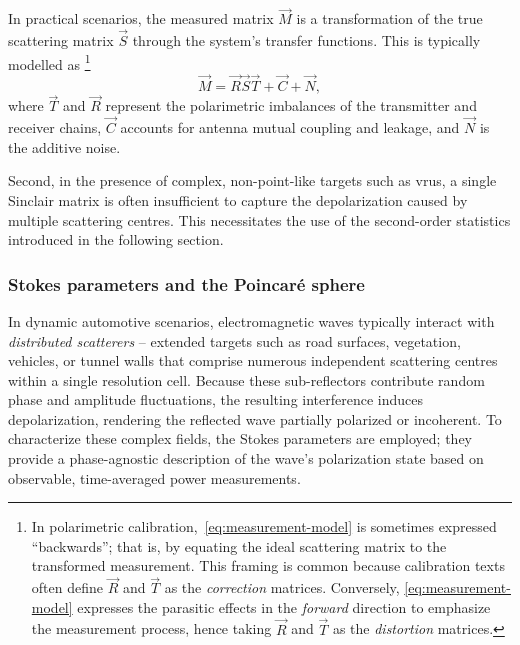 In practical scenarios, the measured matrix $\vec M$ is a transformation of the true scattering matrix $\vec S$ through the system's transfer functions.
This is typically modelled as%
    \footnote{
        In polarimetric calibration,~\cref{eq:measurement-model} is sometimes expressed \enquote{backwards}; that is, by equating the ideal scattering matrix to the transformed measurement.
        This framing is common because calibration texts often define $\vec R$ and $\vec T$ as the \emph{correction} matrices.
        Conversely, \cref{eq:measurement-model} expresses the parasitic effects in the \emph{forward} direction to emphasize the measurement process, hence taking $\vec R$ and $\vec T$ as the \emph{distortion} matrices.
    }
\begin{equation}
    \label{eq:measurement-model}
    \vec M = \vec R \vec S \vec T + \vec C + \vec N,
\end{equation}
where $\vec T$ and $\vec R$ represent the polarimetric imbalances of the transmitter and receiver chains, $\vec C$ accounts for antenna mutual coupling and leakage, and $\vec N$ is the additive noise.

Second, in the presence of complex, non-point-like targets such as \glspl{vru}, a single Sinclair matrix is often insufficient to capture the depolarization caused by multiple scattering centres.
This necessitates the use of the second-order statistics introduced in the following section.


\subsubsection{Stokes parameters and the Poincaré sphere}
\label{sec:stokes-poincare}

In dynamic automotive scenarios, electromagnetic waves typically interact with \emph{distributed scatterers} -- extended targets such as road surfaces, vegetation, vehicles, or tunnel walls that comprise numerous independent scattering centres within a single resolution cell.
Because these sub-reflectors contribute random phase and amplitude fluctuations, the resulting interference induces depolarization, rendering the reflected wave partially polarized or incoherent.
To characterize these complex fields, the Stokes parameters are employed; they provide a phase-agnostic description of the wave's polarization state based on observable, time-averaged power measurements.

